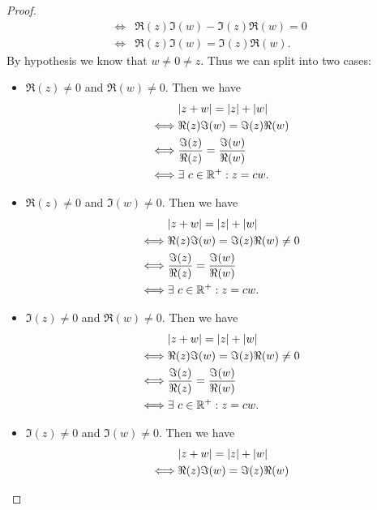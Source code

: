 \begin{proof}
\begin{align*}
    \iff & \Re(z) \Im(w) - \Im(z) \Re(w) = 0                                                                               \\
    \iff & \Re(z) \Im(w) = \Im(z) \Re(w).
  \end{align*}
  By hypothesis we know that \(w \neq 0 \neq z\).
  Thus we can split into two cases:
  \begin{itemize}
    \item \(\Re(z) \neq 0\) and \(\Re(w) \neq 0\).
          Then we have
          \begin{align*}
                 & \abs{z + w} = \abs{z} + \abs{w}               \\
            \iff & \Re(z) \Im(w) = \Im(z) \Re(w)                 \\
            \iff & \frac{\Im(z)}{\Re(z)} = \frac{\Im(w)}{\Re(w)} \\
            \iff & \exists\ c \in \R^+ : z = cw.
          \end{align*}
    \item \(\Re(z) \neq 0\) and \(\Im(w) \neq 0\).
          Then we have
          \begin{align*}
                 & \abs{z + w} = \abs{z} + \abs{w}               \\
            \iff & \Re(z) \Im(w) = \Im(z) \Re(w) \neq 0          \\
            \iff & \frac{\Im(z)}{\Re(z)} = \frac{\Im(w)}{\Re(w)} \\
            \iff & \exists\ c \in \R^+ : z = cw.
          \end{align*}
    \item \(\Im(z) \neq 0\) and \(\Re(w) \neq 0\).
          Then we have
          \begin{align*}
                 & \abs{z + w} = \abs{z} + \abs{w}               \\
            \iff & \Re(z) \Im(w) = \Im(z) \Re(w) \neq 0          \\
            \iff & \frac{\Im(z)}{\Re(z)} = \frac{\Im(w)}{\Re(w)} \\
            \iff & \exists\ c \in \R^+ : z = cw.
          \end{align*}
    \item \(\Im(z) \neq 0\) and \(\Im(w) \neq 0\).
          Then we have
          \begin{align*}
                 & \abs{z + w} = \abs{z} + \abs{w}               \\
            \iff & \Re(z) \Im(w) = \Im(z) \Re(w)                 \\

\end{align*}
\end{itemize}
\end{proof}
